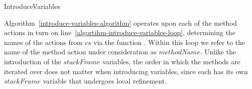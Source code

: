 \begin{algorithm}
\begin{algorithmic}[1]
     
    \EndFor
  \end{algorithmic}
  \caption{IntroduceVariables}
  \label{introduce-variables-algorithm}
\end{algorithm}

Algorithm~\ref{introduce-variables-algorithm} operates upon each of
the method actions in turn on
line~\ref{algortihm-introduce-variables-loop}, determining the names
of the actions from $cs$ via the function .
Within this loop we refer to the name of the method action under
consideration as $methodName$.
Unlike the introduction of the $stackFrame$ variables, the order in
which the methods are iterated over does not matter when introducing
variables, since each has its own $stackFrame$ variable that undergoes
local refinement.

